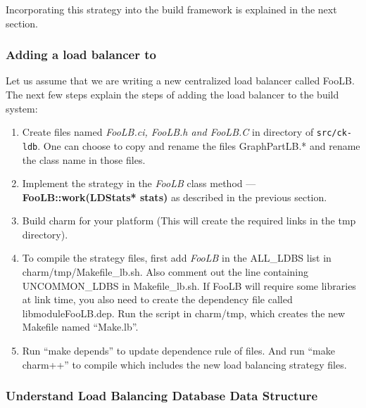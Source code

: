 Incorporating this strategy into the \charmpp{} build framework is explained in
the next section.

\subsubsection{Adding a load balancer to \charmpp{}}

Let us assume that we are writing a new centralized load balancer called FooLB.
The next few steps explain the steps of adding the load balancer to the \charmpp{}
build system:

\begin{enumerate}
\item Create files named {\em FooLB.ci, FooLB.h and FooLB.C} in directory of {\tt src/ck-ldb}.
One can choose to copy and rename the files GraphPartLB.* and rename the class name in those
files.

\item Implement the strategy in the {\em FooLB} class method --- {\bf
FooLB::work(LDStats* stats)} as described in the previous section.

\item Build charm for your platform (This will create the required links in the
tmp directory).

\item To compile the strategy files, first add {\em FooLB} in the ALL\_LDBS
list in charm/tmp/Makefile\_lb.sh. Also comment out the line containing
UNCOMMON\_LDBS in Makefile\_lb.sh.  If FooLB will require some libraries at
link time, you also need to create the dependency file called
libmoduleFooLB.dep. Run the script in charm/tmp, which creates the new Makefile
named ``Make.lb''.

\item Run ``make depends'' to update dependence rule of \charmpp{} files.  And run
``make charm++'' to compile \charmpp{} which includes the new load balancing
strategy files.
\end{enumerate}


\subsubsection{Understand Load Balancing Database Data Structure}

\label{lbdatabase}

